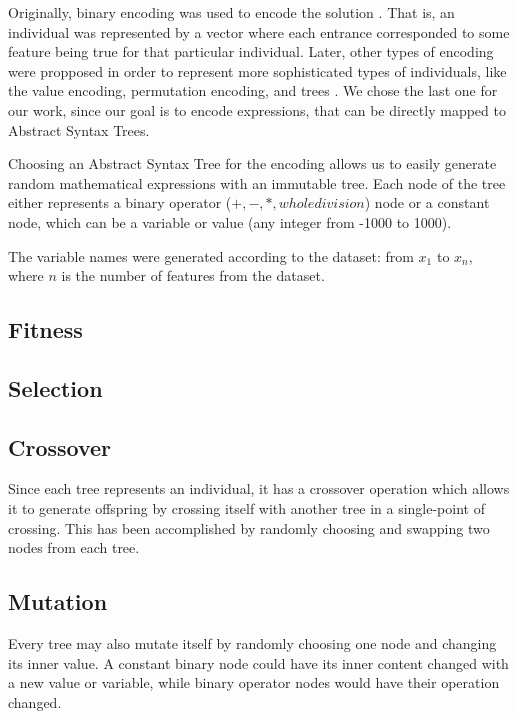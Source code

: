 \documentclass[runningheads]{llncs}
\begin{document}

Originally, binary encoding was used to encode the solution \cite{whitley1994genetic}. That is, an individual was represented by a vector where each entrance corresponded to some feature being true for that particular individual. Later, other types of encoding were propposed in order to represent more sophisticated types of individuals, like the value encoding, permutation encoding, and trees \cite{martins2016gacuda}. We chose the last one for our work, since our goal is to encode expressions, that can be directly mapped to Abstract Syntax Trees.

Choosing an Abstract Syntax Tree for the encoding allows us to easily generate random mathematical expressions with an immutable tree. Each node of the tree either represents a binary operator ($+,-,*,whole division$) node or a constant node, which can be a variable or value (any integer from -1000 to 1000).

The variable names were generated according to the dataset: from $x_{1}$ to $x_{n}$, where $n$ is the number of features from the dataset.

\subsection{Fitness}

\subsection{Selection}

\subsection{Crossover}

Since each tree represents an individual, it has a crossover operation which allows it to generate offspring by crossing itself with another tree in a single-point of crossing. This has been accomplished by randomly choosing and swapping two nodes from each tree.

\subsection{Mutation}

Every tree may also mutate itself by randomly choosing one node and changing its inner value. A constant binary node could have its inner content changed with a new value or variable, while binary operator nodes would have their operation changed.
\end{document}
